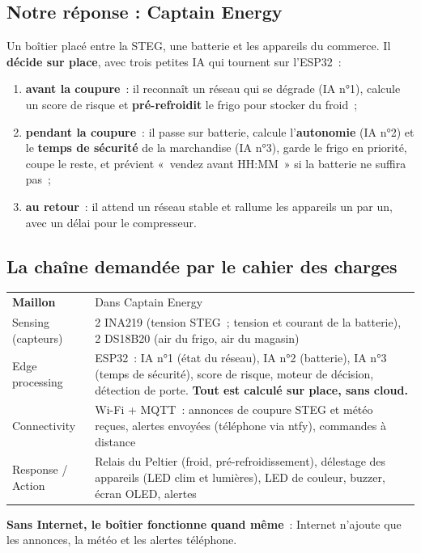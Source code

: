\subsection{Notre réponse : Captain Energy}
Un boîtier placé entre la STEG, une batterie et les appareils du commerce. Il \textbf{décide sur place}, avec trois petites IA qui tournent sur l'ESP32~:
\begin{enumerate}[nosep, leftmargin=2em]
  \item \textbf{avant la coupure}~: il reconnaît un réseau qui se dégrade (IA n°1), calcule un score de risque et \textbf{pré-refroidit} le frigo pour stocker du froid~;
  \item \textbf{pendant la coupure}~: il passe sur batterie, calcule l'\textbf{autonomie} (IA n°2) et le \textbf{temps de sécurité} de la marchandise (IA n°3), garde le frigo en priorité, coupe le reste, et prévient «~vendez avant HH:MM~» si la batterie ne suffira pas~;
  \item \textbf{au retour}~: il attend un réseau stable et rallume les appareils un par un, avec un délai pour le compresseur.
\end{enumerate}

\subsection{La chaîne demandée par le cahier des charges}
\begin{tabularx}{\linewidth}{P{3.2cm}L}
 \textbf{Maillon} & Dans Captain Energy \\
Sensing (capteurs) & 2 INA219 (tension STEG~; tension et courant de la batterie), 2 DS18B20 (air du frigo, air du magasin) \\
Edge processing & ESP32~: IA n°1 (état du réseau), IA n°2 (batterie), IA n°3 (temps de sécurité), score de risque, moteur de décision, détection de porte. \textbf{Tout est calculé sur place, sans cloud.} \\
Connectivity & Wi-Fi + MQTT~: annonces de coupure STEG et météo reçues, alertes envoyées (téléphone via ntfy), commandes à distance \\
Response / Action & Relais du Peltier (froid, pré-refroidissement), délestage des appareils (LED clim et lumières), LED de couleur, buzzer, écran OLED, alertes \\
\end{tabularx}
\textbf{Sans Internet, le boîtier fonctionne quand même}~: Internet n'ajoute que les annonces, la météo et les alertes téléphone.

